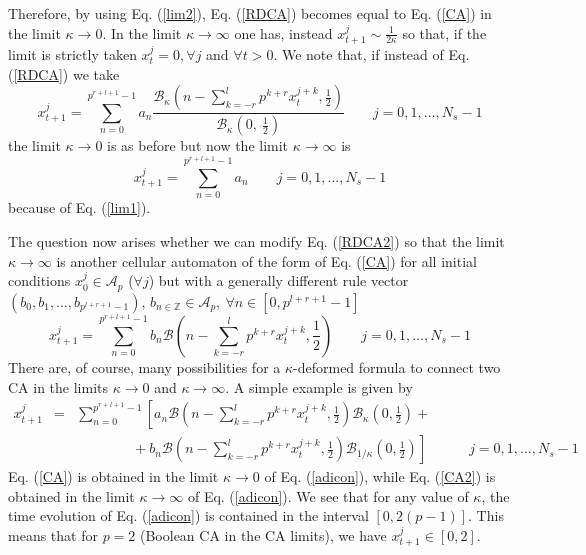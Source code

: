 \documentclass[aps,pre,preprint,floatfix]{revtex4}
\theoremstyle{plain} \newtheorem{defi}{Definition}[section]
\theoremstyle{plain} \newtheorem{prop}{Proposition}[section]
\theoremstyle{plain} \newtheorem{theor}{Theorem}[section]
\theoremstyle{plain} \newtheorem{lemma}{Lemma}[section]
\theoremstyle{plain} \newtheorem*{corol}{Corollary}
\theoremstyle{remark} \newtheorem*{rem}{Remark}
\theoremstyle{plain} \newtheorem{exer}{Exercise}[section]
\theoremstyle{remark} \newtheorem*{ans}{Answer}
\begin{document}
Therefore, by using Eq. (\ref{lim2}), Eq. (\ref{RDCA}) becomes equal to Eq. (\ref{CA}) in the limit $\kappa \to 0$. In the limit $\kappa \to \infty$ one has, instead $x_{t+1}^{j} \sim \frac{1}{2\kappa}$ \cite{JPHYSA} so that, if the limit is strictly taken $x_{t}^{j}=0, \forall j$ and $\forall t>0$. We note that, if instead of Eq. (\ref{RDCA}) we take
\begin{equation}
x_{t+1}^{j}=\sum_{n=0}^{p^{r+l+1}-1}a_{n}\frac{\mathcal{B}_{\kappa}\left(n-\sum_{k=-r}^{l}p^{k+r}x_{t}^{j+k},\frac{1}{2}\right)}{\mathcal{B}_{\kappa}\left(0,\ \frac{1}{2}\right)} \qquad j=0,1,\ldots, N_{s}-1 \label{RDCA2}
\end{equation} 
the limit $\kappa \to 0$ is as before but now the limit $\kappa \to \infty$ is
\begin{equation}
x_{t+1}^{j}=\sum_{n=0}^{p^{r+l+1}-1}a_{n} \qquad j=0,1,\ldots, N_{s}-1 \label{RDCA2lim}
\end{equation} 
because of Eq. (\ref{lim1}).


The question now arises whether we can modify Eq. (\ref{RDCA2}) so that  the limit $\kappa \to \infty$ is another cellular automaton of the form of Eq. (\ref{CA}) for all initial conditions $x_0^j \in \mathcal{A}_p$ ($\forall j$) but with a generally different rule vector $(b_{0},b_{1},\ldots, b_{p^{l+r+1}-1})$, $b_{n\in \mathbb{Z}}\in \mathcal{A}_{p},\ \forall n\in[0,p^{l+r+1}-1]$
\begin{equation}
x_{t+1}^{j}=\sum_{n=0}^{p^{r+l+1}-1}b_{n}\mathcal{B}\left(n-\sum_{k=-r}^{l}p^{k+r}x_{t}^{j+k},\frac{1}{2}\right) \qquad j=0,1,\ldots, N_{s}-1 \label{CA2}
\end{equation} 
There are, of course, many possibilities for a $\kappa$-deformed formula to connect two CA in the limits $\kappa \to 0$ and $\kappa \to \infty$. A simple example is given by
\begin{eqnarray}
x_{t+1}^{j}&=&\sum_{n=0}^{p^{r+l+1}-1}\left[a_{n}\mathcal{B}\left(n-\sum_{k=-r}^{l}p^{k+r}x_{t}^{j+k},\frac{1}{2}\right)\mathcal{B}_{\kappa}\left(0, \frac{1}{2}\right)+\right.\nonumber \\
&&\qquad \qquad +\left.b_{n} \mathcal{B}\left(n-\sum_{k=-r}^{l}p^{k+r}x_{t}^{j+k},\frac{1}{2}\right)\mathcal{B}_{1/\kappa}\left(0, \frac{1}{2}\right)\right] \quad \qquad j=0,1,\ldots, N_{s}-1   \label{adicon}
\end{eqnarray} 
Eq. (\ref{CA}) is obtained in the limit $\kappa \to 0$ of Eq. (\ref{adicon}), while Eq. (\ref{CA2}) is obtained in the limit $\kappa \to \infty$ of Eq. (\ref{adicon}). We see that for any value of $\kappa$, the time evolution of Eq. (\ref{adicon}) is contained in the interval $[0,2(p-1)]$. This means that for $p=2$ (Boolean CA in the CA limits), we have $x_{t+1}^{j}\in [0,2]$. 
\end{document}
